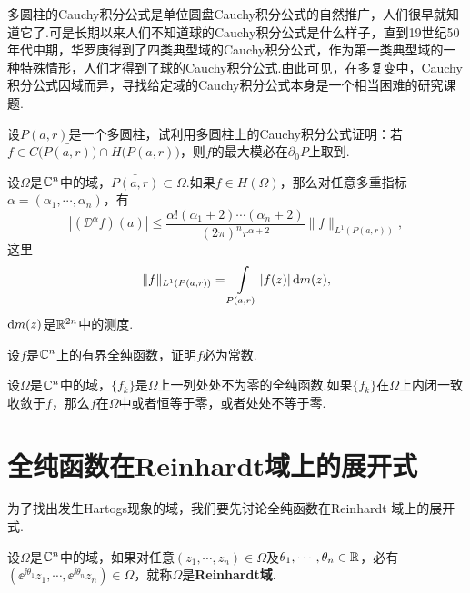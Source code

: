多圆柱的Cauchy积分公式是单位圆盘Cauchy积分公式的自然推广，人们很早就知道它了.可是长期以来人们不知道球的Cauchy积分公式是什么样子，直到19世纪50年代中期，华罗庚得到了四类典型域的Cauchy积分公式，作为第一类典型域的一种特殊情形，人们才得到了球的Cauchy积分公式.由此可见，在多复变中，Cauchy积分公式因域而异，寻找给定域的Cauchy积分公式本身是一个相当困难的研究课题.
\begin{xiti}
\item 设$P(a,r)$是一个多圆柱，试利用多圆柱上的Cauchy积分公式证明：若$f\in C\big(\bar{P(a,r)}\big)\cap H\big(P(a,r)\big)$，则$f$的最大模必在$\partial_0P$上取到.
\item 设$\Omega$是$\mathbb C^n$中的域，$\bar{P(a,r)}\subset\Omega$.如果$f\in H(\Omega)$，那么对任意多重指标$\alpha=(\alpha_1,\cdots,\alpha_n)$，有
    \[|(\DD^\alpha f)(a)|\le\frac{\alpha!(\alpha_1+2)\cdots(\alpha_n+2)}{(2\pi)^nr^{\alpha+2}}\|f\|
    _{L^1(P(a,r))},\]
这里
\[\|f\|_{L^1(P(a,r))}=\int\limits_{P(a,r)}|f(z)|\mathop{}\!\mathrm{d} m(z),\]
$\mathop{}\!\mathrm{d} m(z)$是$\mathbb R^{2n}$中的测度.
\item 设$f$是$\mathbb C^n$上的有界全纯函数，证明$f$必为常数.
\item 设$\Omega$是$\mathbb C^n$中的域，$\{f_k\}$是$\Omega$上一列处处不为零的全纯函数.如果$\{f_k\}$在$\Omega$上内闭一致收敛于$f$，那么$f$在$\Omega$中或者恒等于零，或者处处不等于零.
\end{xiti}

\section{全纯函数在Reinhardt域上的展开式\label{sec9.3}}
为了找出发生Hartogs现象的域，我们要先讨论全纯函数在Reinhardt 域上的展开式.
\begin{definition}\label{def9.3.1}
设$\Omega$是$\mathbb C^n$中的域，如果对任意$(z_1,\cdots,z_n)\in\Omega$及$\theta_1,\cdots,\theta_n\in\mathbb R$，必有$(\ee^{\ii\theta_1}z_1,\cdots,\ee^{\ii\theta_n}z_n)\in\Omega$，就称$\Omega$是\textbf{Reinhardt域}.
\end{definition}


